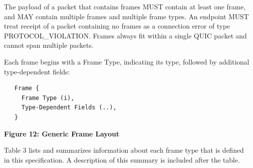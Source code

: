\documentclass{article}
\begin{document}
The payload of a packet that contains frames MUST contain at least one frame, and MAY contain multiple frames and multiple frame types. An endpoint MUST treat receipt of a packet containing no frames as a connection error of type PROTOCOL\_VIOLATION.  Frames always fit within a single QUIC packet and cannot span multiple packets.

Each frame begins with a Frame Type, indicating its type, followed by additional type-dependent fields:

\begin{verbatim}
   Frame {
     Frame Type (i),
     Type-Dependent Fields (..),
   }
\end{verbatim}

\begin{center}
\textbf{Figure 12: Generic Frame Layout}
\end{center}

Table 3 lists and summarizes information about each frame type that is defined in this specification.  A description of this summary is included after the table.
\end{document}
